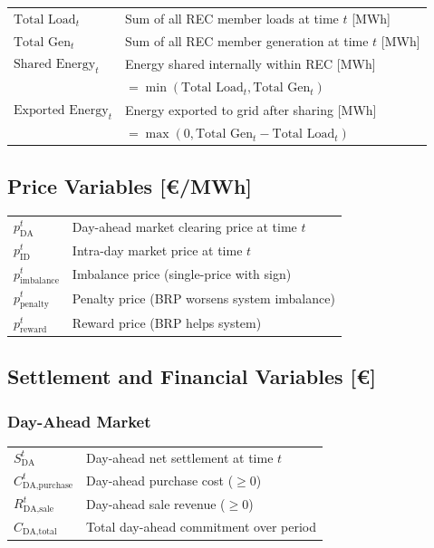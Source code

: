 \begin{tabular}{ll}
$\text{Total Load}_t$ & Sum of all REC member loads at time $t$ [MWh] \\
$\text{Total Gen}_t$ & Sum of all REC member generation at time $t$ [MWh] \\
$\text{Shared Energy}_t$ & Energy shared internally within REC [MWh] \\
                          & $= \min(\text{Total Load}_t, \text{Total Gen}_t)$ \\
$\text{Exported Energy}_t$ & Energy exported to grid after sharing [MWh] \\
                            & $= \max(0, \text{Total Gen}_t - \text{Total Load}_t)$ \\
\end{tabular}

\subsection{Price Variables [\euro/MWh]}

\begin{tabular}{ll}
$p_{\text{DA}}^{t}$ & Day-ahead market clearing price at time $t$ \\
$p_{\text{ID}}^{t}$ & Intra-day market price at time $t$ \\
$p_{\text{imbalance}}^{t}$ & Imbalance price (single-price with sign) \\
$p_{\text{penalty}}^{t}$ & Penalty price (BRP worsens system imbalance) \\
$p_{\text{reward}}^{t}$ & Reward price (BRP helps system) \\
\end{tabular}

\subsection{Settlement and Financial Variables [\euro]}

\subsubsection{Day-Ahead Market}

\begin{tabular}{ll}
$S_{\text{DA}}^{t}$ & Day-ahead net settlement at time $t$ \\
$C_{\text{DA,purchase}}^{t}$ & Day-ahead purchase cost ($\geq 0$) \\
$R_{\text{DA,sale}}^{t}$ & Day-ahead sale revenue ($\geq 0$) \\
$C_{\text{DA,total}}$ & Total day-ahead commitment over period \\
\end{tabular}

